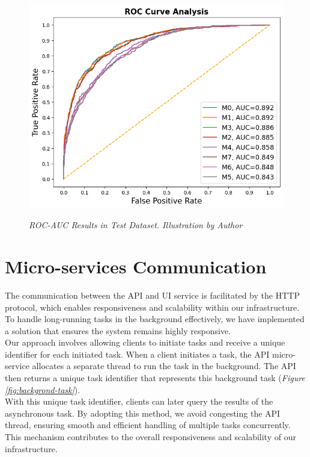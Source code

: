 \begin{figure}[H]
  \centering
  \includegraphics[width=\textwidth]{imatges/results/rocaucanalysis-all.png}
  \caption[ROC-AUC Results in Test Dataset]{\textit{ROC-AUC Results in Test Dataset. Illustration by Author}}
  {\label{fig:rocaucanalysis-all}}
\end{figure}

\newpage


\section{Micro-services Communication}

The communication between the API and UI service is facilitated by the HTTP
protocol, which enables responsiveness and scalability within our
infrastructure. To handle long-running tasks in the background effectively, we
have implemented a solution that ensures the system remains highly responsive.
\\

Our approach involves allowing clients to initiate tasks and receive a unique
identifier for each initiated task. When a client initiates a task, the API
micro-service allocates a separate thread to run the task in the background.
The API then returns a unique task identifier that represents this background
task (\textit{Figure \ref{fig:backgrond-task}}). \\

With this unique task identifier, clients can later query the results of the
asynchronous task. By adopting this method, we avoid congesting the API thread,
ensuring smooth and efficient handling of multiple tasks concurrently. This
mechanism contributes to the overall responsiveness and scalability of our
infrastructure.

